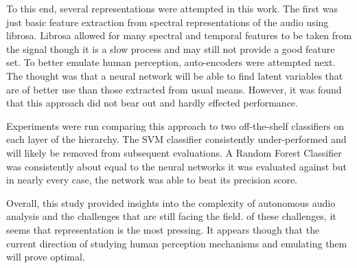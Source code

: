 To this end, several representations were attempted in this work. The first was
just basic feature extraction from spectral representations of the audio using
librosa. Librosa allowed for many spectral and temporal features to be taken
from the signal though it is a slow process and may still not provide a good
feature set. To better emulate human perception, auto-encoders were attempted
next. The thought was that a neural network will be able to find latent
variables that are of better use than those extracted from usual means. However,
it was found that this approach did not bear out and hardly effected
performance.

Experiments were run comparing this approach to two off-the-shelf classifiers on
each layer of the hierarchy. The SVM classifier consistently under-performed and
will likely be removed from subsequent evaluations. A Random Forest Classifier
was consistently about equal to the neural networks it was evaluated against but
in nearly every case, the network was able to beat its precision score.

Overall, this study provided insights into the complexity of autonomous audio
analysis and the challenges that are still facing the field. of these
challenges, it seems that representation is the most pressing. It appears though
that the current direction of studying human perception mechanisms and emulating
them will prove optimal.

